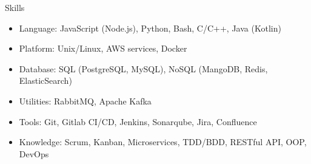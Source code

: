 \documentclass[print]{mcdowellcv}
\begin{document}
	\begin{cvsection}{Skills}
		\begin{cvsubsection}{}{}{}	
			\begin{itemize}
				\item Language: JavaScript (Node.js), Python, Bash, C/C++, Java (Kotlin)
				\item Platform: Unix/Linux, AWS services, Docker
                    \item Database: SQL (PostgreSQL, MySQL), NoSQL (MangoDB, Redis, ElasticSearch)
				\item Utilities: RabbitMQ, Apache Kafka
				\item Tools: Git, Gitlab CI/CD, Jenkins, Sonarqube, Jira, Confluence
				\item Knowledge: Scrum, Kanban, Microservices, TDD/BDD, RESTful API, OOP, DevOps
			\end{itemize}
		\end{cvsubsection}
	\end{cvsection}
\end{document}
